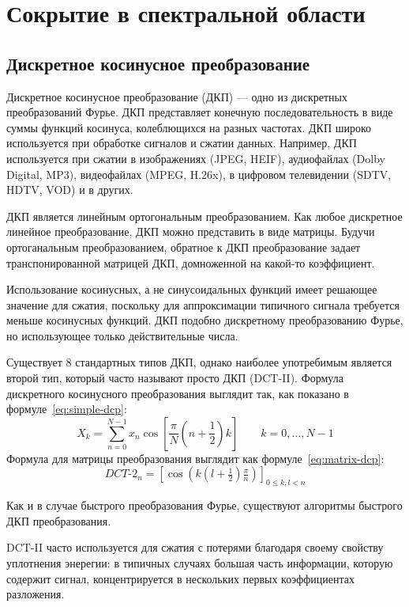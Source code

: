 \chapter{Сокрытие в спектральной области}
\section{Дискретное косинусное преобразование}
Дискретное косинусное преобразование (ДКП) --- одно из дискретных преобразований Фурье.
ДКП представляет конечную последовательность в виде суммы функций косинуса,
колеблющихся на разных частотах. ДКП широко используется при обработке сигналов и сжатии данных.
Например, ДКП используется при сжатии в изображениях (JPEG, HEIF), аудиофайлах (Dolby Digital, MP3),
видеофайлах (MPEG, H.26x), в цифровом телевидении (SDTV, HDTV, VOD) и в других.

ДКП является линейным ортогональным преобразованием. Как любое дискретное линейное преобразование,
ДКП можно представить в виде матрицы. Будучи ортоганальным преобразованием, обратное к ДКП преобразование
задает транспонированной матрицей ДКП, домноженной на какой-то коэффициент.

Использование косинусных, а не синусоидальных функций имеет решающее значение для сжатия,
поскольку для аппроксимации типичного сигнала требуется меньше косинусных функций.
ДКП подобно дискретному преобразованию Фурье, но использующее только действительные числа.

Существует 8 стандартных типов ДКП, однако наиболее употребимым является второй тип,
который часто называют просто ДКП (DCT-II).
Формула дискретного косинусного преобразования выглядит так,
как показано в формуле~\ref{eq:simple-dcp}:
\begin{equation} \label{eq:simple-dcp}
    X_k = \sum_{n=0}^{N-1} x_n \cos \left[\frac{\pi}{N} \left(n+\frac{1}{2}\right) k \right] \quad \quad k = 0, \dots, N-1    
\end{equation}
Формула для матрицы преобразования выглядит как формуле~\ref{eq:matrix-dcp}:
\begin{equation} \label{eq:matrix-dcp}
    {DCT}\text{-}2_n= \left[\cos (k(l+\tfrac{1}{2})\tfrac{\pi}{n})\right]_{0\leq k,l<n}    
\end{equation}

Как и в случае быстрого преобразования Фурье, существуют алгоритмы быстрого ДКП преобразования.

DCT-II часто используется для сжатия с потерями благодаря своему свойству уплотнения энерегии:
в типичных случаях большая часть информации, которую содержит сигнал, концентрируется в нескольких
первых коэффициентах разложения.

